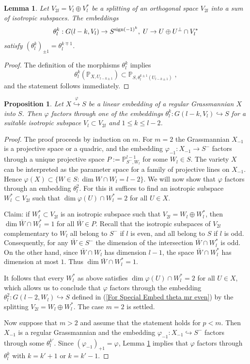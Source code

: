 \documentclass[12pt]{amsart}
\def\PP {{\mathbb P}}     %
\def\hw  {\hookrightarrow}
\newtheorem{lemma}[theorem]{Lemma}
\newtheorem{prop}[theorem]{Proposition}
\begin{document}
\begin{lemma}\label{Lemma theta plus minus}
Let $V_{2l}=V_l\oplus V_l^*$ be a splitting of an orthogonal space $V_{2l}$ into a sum of isotropic subspaces. The embeddings 
$$
\theta_{l}^{k}:G(l-k,V_l)\to S^{{\rm sign}(-1)^k},\; U\to U\oplus U^\perp\cap V_l^*
$$
satisfy $(\theta_l^{k})_{\pm 1}=\theta_{l}^{k\mp1}$.
\end{lemma}

\begin{proof}
The definition of the morphisms $\theta_l^k$ implies
$$
\theta_{l}^{k}(\PP_{X,U_{l-k\pm1}}) \subset \PP_{S,\theta_{l}^{k\pm 1}(U_{l-k\pm1})} \;,
$$
and the statement follows immediately.
\end{proof}


\begin{prop}\label{Prop regular in spinor through theta}
Let $X\stackrel{\varphi}{\hw} S$ be a linear embedding of a regular Grassmannian $X$ into $S$. Then $\varphi$ factors through one of the embeddings $\theta_l^k:G(l-k,V_l)\hw S$ for a suitable isotropic subspace $V_l\subset V_{2l}$ and $1\leq k\leq l-2$.
\end{prop}


\begin{proof}
The proof proceeds by induction on $m$. For $m=2$ the Grassmannian $X_{-1}$ is a projective space or a quadric, and the embedding $\varphi_{-1}:X_{-1}\to S^{-}$ factors through a unique projective space $P:=\PP^{l-1}_{S^{-},W_{l}}$ for some $W_{l}\in S$. The variety $X$ can be interpreted as the parameter space for a family of projective lines on $X_{-1}$. Hence $\varphi(X)\subset \{W\in S: \dim W\cap W_l=l-2\}$. We will now show that $\varphi$ factors through an embedding $\theta_l^2$. For this it suffices to find an isotropic subspace $W_l^*\subset V_{2l}$ such that $\dim \varphi(U)\cap W_l^*=2$ for all $U\in X$.

Claim: if $W_l^*\subset V_{2l}$ is an isotropic subspace such that $V_{2l}=W_l\oplus W_l^*$, then $\dim \bar W\cap W_l^*=1$ for all $\bar W\in P$. Recall that the isotropic subspaces of $V_{2l}$ complementary to $W_l$ all belong to $S^{-}$ if $l$ is even, and all belong to $S$ if $l$ is odd. Consequently, for any $\bar W\in S^{-}$ the dimension of the intersection $\bar W\cap W_l^*$ is odd. On the other hand, since $\bar W\cap W_l$ has dimension $l-1$, the space $\bar W\cap W_l^*$ has dimension at most $1$. Thus $\dim \bar W\cap W_l^*=1$.

It follows that every $W_l^*$ as above satisfies $\dim \varphi(U)\cap W_l^*=2$ for all $U\in X$, which allows us to conclude that $\varphi$ factors through the embedding $\theta_{l}^2:G(l-2,W_l)\hw S$ defined in (\ref{For Special Embed theta mr even}) by the splitting $V_{2l}=W_l\oplus W_l^*$. The case $m=2$ is settled.

Now suppose that $m>2$ and assume that the statement holds for $p<m$. Then $X_{-1}$ is a regular Grassmannian and the embedding $\varphi_{-1}:X_{-1}\hw S^{-}$ factors through some $\theta_{l}^{k'}$. Since $(\varphi_{-1})_{+1}=\varphi$, Lemma \ref{Lemma theta plus minus} implies that $\varphi$ factors through $\theta_l^k$ with $k=k'+1$ or $k=k'-1$.
\end{proof}
\end{document}
